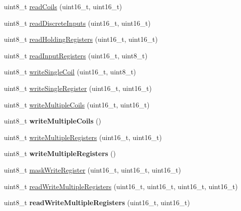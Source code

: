 \begin{DoxyCompactItemize}
\item 
uint8\+\_\+t \hyperlink{class_modbus_master232_a90be1ec752704f889756412adcc66388}{read\+Coils} (uint16\+\_\+t, uint16\+\_\+t)
\item 
uint8\+\_\+t \hyperlink{class_modbus_master232_a0f56c27d45b18429519ad691f2c78800}{read\+Discrete\+Inputs} (uint16\+\_\+t, uint16\+\_\+t)
\item 
uint8\+\_\+t \hyperlink{class_modbus_master232_a7abdc6c3580b803667798bfb7aff3529}{read\+Holding\+Registers} (uint16\+\_\+t, uint16\+\_\+t)
\item 
uint8\+\_\+t \hyperlink{class_modbus_master232_a0cfb23cdda96fea7b1701ccf528bd449}{read\+Input\+Registers} (uint16\+\_\+t, uint8\+\_\+t)
\item 
uint8\+\_\+t \hyperlink{class_modbus_master232_a6b5aac6d76d69e72a61497c96d049e54}{write\+Single\+Coil} (uint16\+\_\+t, uint8\+\_\+t)
\item 
uint8\+\_\+t \hyperlink{class_modbus_master232_a43acfa022f7cb4484bb6b3d6788a0226}{write\+Single\+Register} (uint16\+\_\+t, uint16\+\_\+t)
\item 
uint8\+\_\+t \hyperlink{class_modbus_master232_a6bc096e96a83323bd06aa531a8152bfe}{write\+Multiple\+Coils} (uint16\+\_\+t, uint16\+\_\+t)
\item 
uint8\+\_\+t {\bfseries write\+Multiple\+Coils} ()\hypertarget{class_modbus_master232_a7d1de63383c9e7b62153d683b8e4a7dc}{}\label{class_modbus_master232_a7d1de63383c9e7b62153d683b8e4a7dc}

\item 
uint8\+\_\+t \hyperlink{class_modbus_master232_a2b04f2c6f1ea615f2f241db2f4a948b5}{write\+Multiple\+Registers} (uint16\+\_\+t, uint16\+\_\+t)
\item 
uint8\+\_\+t {\bfseries write\+Multiple\+Registers} ()\hypertarget{class_modbus_master232_a115229a614109785aef3a914d59f5a54}{}\label{class_modbus_master232_a115229a614109785aef3a914d59f5a54}

\item 
uint8\+\_\+t \hyperlink{class_modbus_master232_a1ca67e1b0a58cdabbb463fa102fd3944}{mask\+Write\+Register} (uint16\+\_\+t, uint16\+\_\+t, uint16\+\_\+t)
\item 
uint8\+\_\+t \hyperlink{class_modbus_master232_a34d4cd9268235fd21e28611e20f532a7}{read\+Write\+Multiple\+Registers} (uint16\+\_\+t, uint16\+\_\+t, uint16\+\_\+t, uint16\+\_\+t)
\item 
uint8\+\_\+t {\bfseries read\+Write\+Multiple\+Registers} (uint16\+\_\+t, uint16\+\_\+t)\hypertarget{class_modbus_master232_a6cacc11e9026e88e546e7bb6e169e776}{}\label{class_modbus_master232_a6cacc11e9026e88e546e7bb6e169e776}

\end{DoxyCompactItemize}
